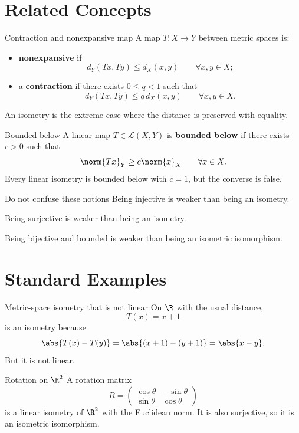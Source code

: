 \documentclass[header={Ancillary Note: Isometries},notheorems]{study-note}
\begin{document}
\section{Related Concepts}

\begin{defbox}{Contraction and nonexpansive map}
A map $T:X\to Y$ between metric spaces is:
\begin{itemize}
\item \textbf{nonexpansive} if
\[
d_Y(Tx,Ty)\le d_X(x,y) \qquad \forall x,y\in X;
\]
\item a \textbf{contraction} if there exists $0\le q<1$ such that
\[
d_Y(Tx,Ty)\le q\,d_X(x,y) \qquad \forall x,y\in X.
\]
\end{itemize}
An isometry is the extreme case where the distance is preserved with equality.
\end{defbox}

\begin{defbox}{Bounded below}
A linear map $T\in\mathcal L(X,Y)$ is \textbf{bounded below} if there exists $c>0$ such that
\[
\norm{Tx}_Y\ge c\norm{x}_X \qquad \forall x\in X.
\]
Every linear isometry is bounded below with $c=1$, but the converse is false.
\end{defbox}

\begin{warningbox}{Do not confuse these notions}
Being injective is weaker than being an isometry.

Being surjective is weaker than being an isometry.

Being bijective and bounded is weaker than being an isometric isomorphism.
\end{warningbox}

\section{Standard Examples}

\begin{exbox}{Metric-space isometry that is not linear}
On $\R$ with the usual distance,
\[
T(x)=x+1
\]
is an isometry because
\[
\abs{T(x)-T(y)}=\abs{(x+1)-(y+1)}=\abs{x-y}.
\]
But it is not linear.
\end{exbox}

\begin{exbox}{Rotation on $\R^2$}
A rotation matrix
\[
R=\begin{pmatrix}
\cos \theta & -\sin \theta\\
\sin \theta & \cos \theta
\end{pmatrix}
\]
is a linear isometry of $\R^2$ with the Euclidean norm. It is also surjective, so it is an isometric isomorphism.
\end{exbox}
\end{document}
